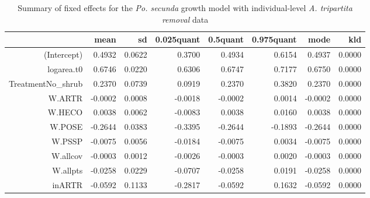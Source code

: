 \documentclass[11pt]{article}
\begin{document}
\begin{table}
\centering
\caption{Summary of fixed effects for the \textit{Po. secunda} growth model with individual-level \textit{A. tripartita removal} data} 
\label{table:POSEgrowth-inARTR}
\begin{tabular}{rrrrrrrr}
  \hline
 & mean & sd & 0.025quant & 0.5quant & 0.975quant & mode & kld \\ 
  \hline
(Intercept) & 0.4932 & 0.0622 & 0.3700 & 0.4934 & 0.6154 & 0.4937 & 0.0000 \\ 
  logarea.t0 & 0.6746 & 0.0220 & 0.6306 & 0.6747 & 0.7177 & 0.6750 & 0.0000 \\ 
  TreatmentNo\_shrub & 0.2370 & 0.0739 & 0.0919 & 0.2370 & 0.3820 & 0.2370 & 0.0000 \\ 
  W.ARTR & -0.0002 & 0.0008 & -0.0018 & -0.0002 & 0.0014 & -0.0002 & 0.0000 \\ 
  W.HECO & 0.0038 & 0.0062 & -0.0083 & 0.0038 & 0.0160 & 0.0038 & 0.0000 \\ 
  W.POSE & -0.2644 & 0.0383 & -0.3395 & -0.2644 & -0.1893 & -0.2644 & 0.0000 \\ 
  W.PSSP & -0.0075 & 0.0056 & -0.0184 & -0.0075 & 0.0034 & -0.0075 & 0.0000 \\ 
  W.allcov & -0.0003 & 0.0012 & -0.0026 & -0.0003 & 0.0020 & -0.0003 & 0.0000 \\ 
  W.allpts & -0.0258 & 0.0229 & -0.0707 & -0.0258 & 0.0191 & -0.0258 & 0.0000 \\ 
  inARTR & -0.0592 & 0.1133 & -0.2817 & -0.0592 & 0.1632 & -0.0592 & 0.0000 \\ 
   \hline
\end{tabular}
\end{table}
\end{document}
